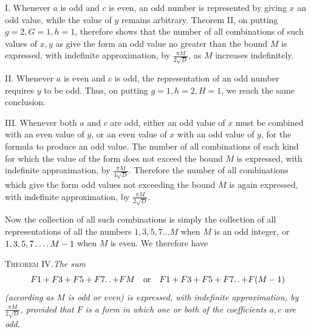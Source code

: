I. Whenever $a$ is odd and $c$ is even, an odd number is represented by giving $x$ an odd value, while the value of $y$ remains arbitrary. Theorem II,
on putting $g=2,G=1,h=1$, therefore shows that the number of all combinations of such values of $x,y$ as give the form an odd value no greater than the bound $M$ is expressed, with indefinite approximation, by $\frac{\pi M}{2\surd D}$, as $M$ increases indefinitely.

II. Whenever $a$ is even and $c$ is odd, the representation of an odd number requires $y$ to be odd. Thus, on putting $g=1,h=2,H=1$, we reach the same conclusion.

III. Whenever both $a$ and $c$ are odd, either an odd value of $x$ must be combined with an even value of $y$, or an even value of $x$ with an odd value of $y$, for the formula to produce an odd value. The number of all combinations of each kind for which the value of the form does not exceed the bound $M$ is expressed, with indefinite approximation, by $\frac{\pi M}{4\surd D}$. Therefore the number of all combinations which give the form odd values not exceeding the bound $M$ is again expressed, with indefinite approximation, by $\frac{\pi M}{2\surd D}$.

Now the collection of all such combinations is simply the collection of all representations of all the numbers $1,3,5,7\ldots M$ when $M$ is an odd integer, or $1,3,5,7\mathinner{.\,.\,.\,.} M-1$ when $M$ is even. We therefore have

\textsc{Theorem IV.}\quad\emph{The sum}
\[
F1+F3+F5+F7\ldotp\ldotp+FM\quad\text{or}\quad F1+F3+F5+F7\ldotp\ldotp+F(M-1)
\]
\emph{(according as $M$ is odd or even) is expressed, with indefinite approximation, by $\frac{\pi M}{2\surd D}$, provided that $F$ is a form in which one or both of the coefficients $a,c$ are odd.}
